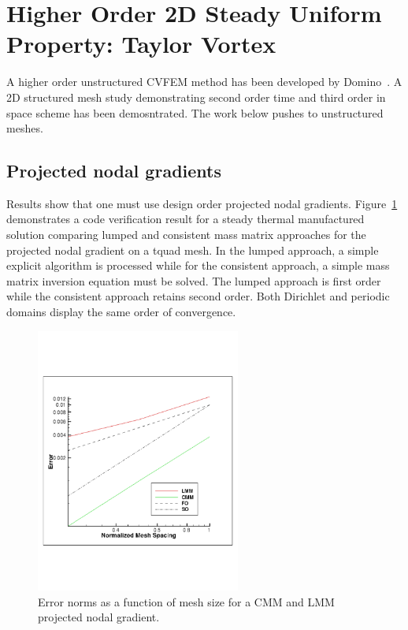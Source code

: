 \section{Higher Order 2D Steady Uniform Property: Taylor Vortex}

A higher order unstructured CVFEM method has been developed by Domino~\cite{Domino:2014}. 
A 2D structured mesh study demonstrating second order time and third order in space scheme 
has been demosntrated. The work below pushes to unstructured meshes.

\subsection{Projected nodal gradients}
Results show that one must use design order projected nodal gradients. Figure~\ref{fig:pngTempMMS} demonstrates 
a code verification result for a steady thermal manufactured solution comparing lumped and consistent mass
matrix approaches for the projected nodal gradient on a tquad mesh. In the lumped approach, a simple 
explicit algorithm is processed while for the consistent approach, a simple mass matrix inversion equation 
must be solved. The lumped approach is first order while the consistent approach retains second order. Both
Dirichlet and periodic domains display the same order of convergence.

\begin{figure}
\centerline{\includegraphics[width=0.6\textwidth]{figures/ho_heatCondMMM_dtdx.pdf}}
\caption{Error norms as a function of mesh size for a CMM and LMM projected nodal gradient.}
\label{fig:pngTempMMS}
\end{figure}

